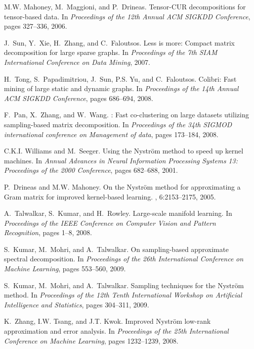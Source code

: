 \documentclass[twoside]{article}
\begin{document}
\begin{small}
\begin{thebibliography}{100}
M.W. Mahoney, M.~Maggioni, and P.~Drineas.
\newblock Tensor-{CUR} decompositions for tensor-based data.
\newblock In {\em Proceedings of the 12th Annual ACM SIGKDD Conference}, pages
  327--336, 2006.

J.~Sun, Y.~Xie, H.~Zhang, and C.~Faloutsos.
\newblock Less is more: Compact matrix decomposition for large sparse graphs.
\newblock In {\em Proceedings of the 7th SIAM International Conference on Data
  Mining}, 2007.

H.~Tong, S.~Papadimitriou, J.~Sun, P.S. Yu, and C.~Faloutsos.
\newblock Colibri: Fast mining of large static and dynamic graphs.
\newblock In {\em Proceedings of the 14th Annual ACM SIGKDD Conference}, pages
  686--694, 2008.

F.~Pan, X.~Zhang, and W.~Wang.
: Fast co-clustering on large datasets utilizing sampling-based
  matrix decomposition.
\newblock In {\em Proceedings of the 34th SIGMOD international conference on
  Management of data}, pages 173--184, 2008.

C.K.I. Williams and M.~Seeger.
\newblock Using the {N}ystr\"{o}m method to speed up kernel machines.
\newblock In {\em Annual Advances in Neural Information Processing Systems 13:
  Proceedings of the 2000 Conference}, pages 682--688, 2001.

P.~Drineas and M.W. Mahoney.
\newblock On the {N}ystr\"{o}m method for approximating a {G}ram matrix for
  improved kernel-based learning.
, 6:2153--2175, 2005.

A.~Talwalkar, S.~Kumar, and H.~Rowley.
\newblock Large-scale manifold learning.
\newblock In {\em Proceedings of the IEEE Conference on Computer Vision and
  Pattern Recognition}, pages 1--8, 2008.

S.~Kumar, M.~Mohri, and A.~Talwalkar.
\newblock On sampling-based approximate spectral decomposition.
\newblock In {\em Proceedings of the 26th International Conference on Machine
  Learning}, pages 553--560, 2009.

S.~Kumar, M.~Mohri, and A.~Talwalkar.
\newblock Sampling techniques for the {N}ystr\"{o}m method.
\newblock In {\em Proceedings of the 12th Tenth International Workshop on
  Artificial Intelligence and Statistics}, pages 304--311, 2009.

K.~Zhang, I.W. Tsang, and J.T. Kwok.
\newblock Improved {N}ystr\"{o}m low-rank approximation and error analysis.
\newblock In {\em Proceedings of the 25th International Conference on Machine
  Learning}, pages 1232--1239, 2008.


\end{thebibliography}
\end{small}
\end{document}
